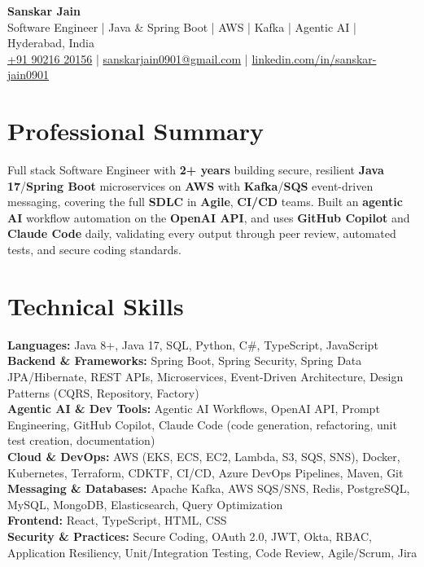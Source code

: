 \documentclass[a4paper,10pt]{article}
\begin{document}
\begin{center}
    {\LARGE \textbf{Sanskar Jain}} \\
    \vspace{2pt}
    Software Engineer \;|\; Java \& Spring Boot \;|\; AWS \;|\; Kafka \;|\; Agentic AI \;|\; Hyderabad, India \\
    \vspace{2pt}
    \href{tel:+919021620156}{+91 90216 20156} \;|\;
    \href{mailto:sanskarjain0901@gmail.com}{sanskarjain0901@gmail.com} \;|\;
    \href{https://www.linkedin.com/in/sanskar-jain0901/}{linkedin.com/in/sanskar-jain0901}
\end{center}

\section*{Professional Summary}
Full stack Software Engineer with \textbf{2+ years} building secure, resilient \textbf{Java 17}/\textbf{Spring Boot} microservices on \textbf{AWS} with \textbf{Kafka}/\textbf{SQS} event-driven messaging, covering the full \textbf{SDLC} in \textbf{Agile}, \textbf{CI/CD} teams.
Built an \textbf{agentic AI} workflow automation on the \textbf{OpenAI API}, and uses \textbf{GitHub Copilot} and \textbf{Claude Code} daily, validating every output through peer review, automated tests, and secure coding standards.

\section*{Technical Skills}
\begin{sloppypar}
\noindent
\textbf{Languages:} Java 8+, Java 17, SQL, Python, C\#, TypeScript, JavaScript \\
\textbf{Backend \& Frameworks:} Spring Boot, Spring Security, Spring Data JPA/Hibernate, REST APIs, Microservices, Event-Driven Architecture, Design Patterns (CQRS, Repository, Factory) \\
\textbf{Agentic AI \& Dev Tools:} Agentic AI Workflows, OpenAI API, Prompt Engineering, GitHub Copilot, Claude Code (code generation, refactoring, unit test creation, documentation) \\
\textbf{Cloud \& DevOps:} AWS (EKS, ECS, EC2, Lambda, S3, SQS, SNS), Docker, Kubernetes, Terraform, CDKTF, CI/CD, Azure DevOps Pipelines, Maven, Git \\
\textbf{Messaging \& Databases:} Apache Kafka, AWS SQS/SNS, Redis, PostgreSQL, MySQL, MongoDB, Elasticsearch, Query Optimization \\
\textbf{Frontend:} React, TypeScript, HTML, CSS \\
\textbf{Security \& Practices:} Secure Coding, OAuth 2.0, JWT, Okta, RBAC, Application Resiliency, Unit/Integration Testing, Code Review, Agile/Scrum, Jira
\end{sloppypar}
\end{document}
